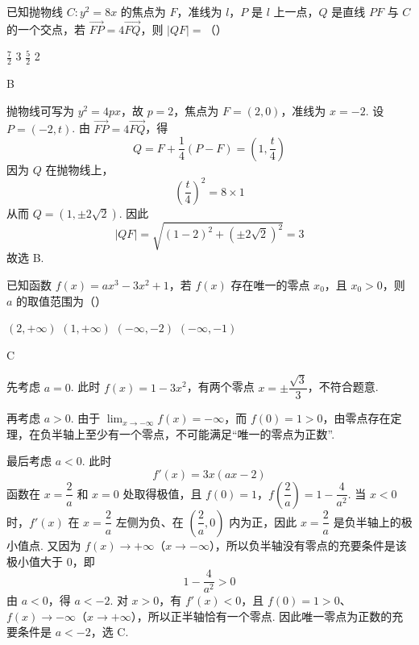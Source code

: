 \begin{problem}
已知抛物线 \(C: y^{2} = 8x\) 的焦点为 \(F\)，准线为 \(l\)，\(P\) 是 \(l\) 上一点，\(Q\) 是直线 \(PF\) 与 \(C\) 的一个交点，若 \(\overrightarrow{FP} = 4\overrightarrow{FQ}\)，则 \(|QF| =\)（\quad）

\choices
    {\(\frac{7}{2}\)}
    {3}
    {\(\frac{5}{2}\)}
    {2}
\end{problem}

\begin{answer}
B
\end{answer}

\begin{solution}
抛物线可写为 \(y^2=4px\)，故 \(p=2\)，焦点为 \(F=(2,0)\)，准线为
\(x=-2\). 设 \(P=(-2,t)\). 由
\(\overrightarrow{FP}=4\overrightarrow{FQ}\)，得
\[
Q=F+\frac14(P-F)=\left(1,\frac t4\right)
\]
因为 \(Q\) 在抛物线上，
\[
\left(\frac t4\right)^2=8\times1
\]
从而 \(Q=(1,\pm2\sqrt2)\). 因此
\[
|QF|=\sqrt{(1-2)^2+(\pm2\sqrt2)^2}=3
\]
故选 B.
\end{solution}

\begin{problem}
已知函数 \( f(x) = ax^3 - 3x^2 + 1 \)，若 \( f(x) \) 存在唯一的零点 \( x_0 \)，且 \( x_0 > 0 \)，则 \( a \) 的取值范围为（\quad）

\choices
    {\((2, +\infty)\)}
    {\((1, +\infty)\)}
    {\((- \infty, -2)\)}
    {\((- \infty, -1)\)}
\end{problem}

\begin{answer}
C
\end{answer}

\begin{solution}
先考虑 \(a=0\). 此时 \(f(x)=1-3x^2\)，有两个零点
\(x=\pm\dfrac{\sqrt3}{3}\)，不符合题意.

再考虑 \(a>0\). 由于
\(\displaystyle\lim_{x\to-\infty}f(x)=-\infty\)，而 \(f(0)=1>0\)，由零点存在定理，在负半轴上至少有一个零点，不可能满足“唯一的零点为正数”.

最后考虑 \(a<0\). 此时
\[
f'(x)=3x(ax-2)
\]
函数在 \(x=\dfrac2a\) 和 \(x=0\) 处取得极值，且
\(f(0)=1\)，\(f\left(\dfrac2a\right)=1-\dfrac4{a^2}\).
当 \(x<0\) 时，\(f'(x)\) 在 \(x=\dfrac2a\) 左侧为负、在
\(\left(\dfrac2a,0\right)\) 内为正，因此 \(x=\dfrac2a\) 是负半轴上的极小值点.
又因为 \(f(x)\to+\infty\)（\(x\to-\infty\)），所以负半轴没有零点的充要条件是该极小值大于 \(0\)，即
\[
1-\frac4{a^2}>0
\]
由 \(a<0\)，得 \(a<-2\). 对 \(x>0\)，有 \(f'(x)<0\)，且
\(f(0)=1>0\)、\(f(x)\to-\infty\)（\(x\to+\infty\)），所以正半轴恰有一个零点.
因此唯一零点为正数的充要条件是 \(a<-2\)，选 C.
\end{solution}

